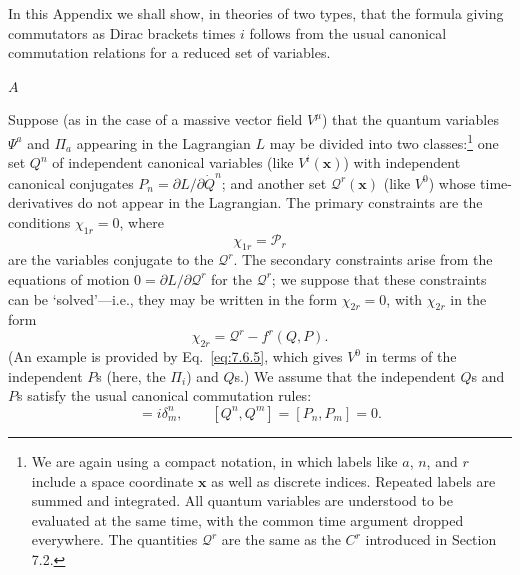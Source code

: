 

In this Appendix we shall show, in theories of two types, that the formula
giving commutators as Dirac brackets times $i$ follows from the usual
canonical commutation relations for a reduced set of variables.

\begin{center}
$A$
\end{center}

Suppose (as in the case of a massive vector field $V^\mu$) that the quantum
variables $\Psi^a$ and $\Pi_a$ appearing in the Lagrangian $L$ may be divided
into two classes:\footnote{We are again using a compact notation, in which
labels like $a$, $n$, and $r$ include a space coordinate $\mathbf{x}$ as well
as discrete indices. Repeated labels are summed and integrated. All quantum
variables are understood to be evaluated at the same time, with the common
time argument dropped everywhere. The quantities $\mathcal{Q}^r$ are the
same as the $C^r$ introduced in Section 7.2.} one set $Q^n$ of independent
canonical variables (like $V^i(\mathbf{x})$) with independent canonical
conjugates $P_n=\partial L/\partial\dot Q^n$; and another set
$\mathcal{Q}^r(\mathbf{x})$ (like $V^0$) whose time-derivatives do not appear
in the Lagrangian. The primary constraints are the conditions
$\chi_{1r}=0$, where
\begin{equation}
  \chi_{1r}=\mathcal{P}_r
  \tag{7.A.1}\label{eq:7.A.1}
\end{equation}
are the variables conjugate to the $\mathcal{Q}^r$. The secondary constraints
arise from the equations of motion $0=\partial L/\partial\mathcal{Q}^r$ for
the $\mathcal{Q}^r$; we suppose that these constraints can be `solved'---i.e.,
they may be written in the form $\chi_{2r}=0$, with $\chi_{2r}$ in the form
\begin{equation}
  \chi_{2r}=\mathcal{Q}^r-f^r(Q,P).
  \tag{7.A.2}\label{eq:7.A.2}
\end{equation}
(An example is provided by Eq.~\eqref{eq:7.6.5}, which gives $V^0$ in terms of the
independent $P$s (here, the $\Pi_i$) and $Q$s.) We assume that the independent
$Q$s and $P$s satisfy the usual canonical commutation rules:
\begin{equation}
  [Q^n,P_m]=i\delta^n_m,\qquad
  [Q^n,Q^m]=[P_n,P_m]=0.
  \tag{7.A.3}\label{eq:7.A.3}
\end{equation}
